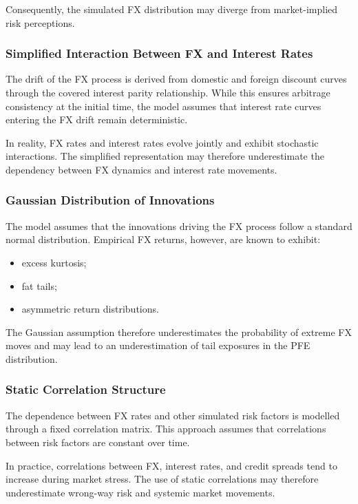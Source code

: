Consequently, the simulated FX distribution may diverge from market-implied risk perceptions.

\subsubsection{Simplified Interaction Between FX and Interest Rates}

The drift of the FX process is derived from domestic and foreign discount curves through the covered interest parity relationship. While this ensures arbitrage consistency at the initial time, the model assumes that interest rate curves entering the FX drift remain deterministic.

In reality, FX rates and interest rates evolve jointly and exhibit stochastic interactions. The simplified representation may therefore underestimate the dependency between FX dynamics and interest rate movements.

\subsubsection{Gaussian Distribution of Innovations}

The model assumes that the innovations driving the FX process follow a standard normal distribution. Empirical FX returns, however, are known to exhibit:

\begin{itemize}
	\item excess kurtosis;
	\item fat tails;
	\item asymmetric return distributions.
\end{itemize}

The Gaussian assumption therefore underestimates the probability of extreme FX moves and may lead to an underestimation of tail exposures in the PFE distribution.

\subsubsection{Static Correlation Structure}

The dependence between FX rates and other simulated risk factors is modelled through a fixed correlation matrix. This approach assumes that correlations between risk factors are constant over time.

In practice, correlations between FX, interest rates, and credit spreads tend to increase during market stress. The use of static correlations may therefore underestimate wrong-way risk and systemic market movements.

